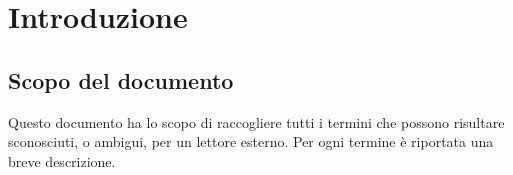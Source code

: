 \section{Introduzione}
\subsection{Scopo del documento}
Questo documento ha lo scopo di raccogliere tutti i termini che possono risultare sconosciuti, o ambigui, per un lettore esterno. Per ogni termine è riportata una breve descrizione.
